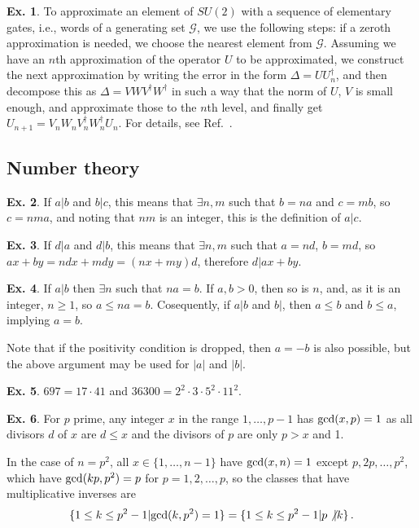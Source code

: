 \documentclass[a4paper,12pt]{article}
\theoremstyle{definition}
\newtheorem{exercise}{Ex.}[section]
\begin{document}
\begin{exercise}
 To approximate an element of $SU(2)$ with a sequence of elementary gates, i.e., words of a generating set $\mathcal{G}$, we use the following steps: if a zeroth approximation is needed, we choose the nearest element from $\mathcal{G}$. Assuming we have an $n$th approximation of the operator $U$ to be approximated, we construct the next approximation by writing the error in the form $\Delta=U U_n^\dagger$, and then decompose this as $\Delta=VWV^\dagger W^\dagger$ in such a way that the norm of $U$, $V$ is small enough, and approximate those to the $n$th level, and finally get $U_{n+1} = V_n W_n V_n^\dagger W_n^\dagger U_n$. For details, see Ref.\ \cite{SKapprox}.
\end{exercise}


\subsection{Number theory}\label{app:numberTheory}

\begin{exercise}
 If $a|b$ and $b|c$, this means that $\exists n,m$ such that $b=na$ and $c=mb$, so $c=nma$, and noting that $nm$ is an integer, this is the definition of $a|c$.
\end{exercise}

\begin{exercise}
 If $d|a$ and $d|b$, this means that $\exists n,m$ such that $a=nd$, $b=md$, so $ax+by=ndx + mdy=(nx+my)d$, therefore $d|ax+by$.
\end{exercise}

\begin{exercise}
 If $a|b$ then $\exists n$ such that $na=b$. If $a,b >0$, then so is $n$, and, as it is an integer, $n\ge 1$, so $a\le na =b$. Cosequently, if $a|b$ and $b|$, then $a\le b$ and $b\le a$, implying $a=b$.
 
 Note that if the positivity condition is dropped, then $a=-b$ is also possible, but the above argument may be used for $|a|$ and $|b|$.
\end{exercise}

\begin{exercise}
 $697=17\cdot 41$ and $36300=2^2 \cdot 3 \cdot 5^2 \cdot 11^2$.
\end{exercise}

\begin{exercise}
 For $p$ prime, any integer $x$ in the range $1,\dots,p-1$ has ${\rm gcd}(x,p)=1$ as all divisors $d$ of $x$ are $d\le x$ and the divisors of $p$ are only $p>x$ and 1.
 
 In the case of $n=p^2$, all $x\in\{1,\dots, n-1\}$ have ${\rm gcd}(x, n)=1$ except $p, 2p,\dots,p^2$, which have ${\rm gcd}(kp,p^2)=p$ for $p=1,2,\dots,p$, so the classes that have multiplicative inverses are
 \[
  \{1\le k\le p^2-1|{\rm gcd}(k,p^2)=1\}=\{1\le k\le p^2-1|p\not|k\}\,.
 \]
\end{exercise}
\end{document}
